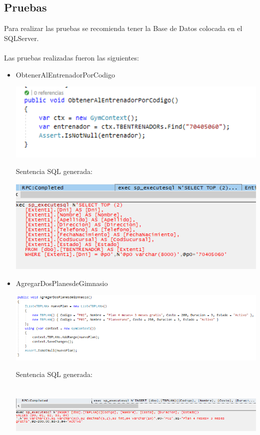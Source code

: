 \subsection{Pruebas}
Para realizar las pruebas se recomienda tener la Base de Datos colocada en el SQLServer.
\\\\
Las pruebas realizadas fueron las siguientes:
\begin{itemize}
	\item ObtenerAlEntrenadorPorCodigo 
\begin{center}
\includegraphics[width=15cm]{./Imagenes/prueba1.png}
\end{center}
Sentencia SQL generada:
\begin{center}
\includegraphics[width=15cm]{./Imagenes/profile1.png}
\end{center}
	\item AgregarDosPlanesdeGimnasio
\begin{center}
\includegraphics[width=17cm]{./Imagenes/prueba2.png}
\end{center}
Sentencia SQL generada:
\begin{center}
\includegraphics[width=17cm, height=3cm]{./Imagenes/profile2-1.png}

\end{center}
\end{itemize}
